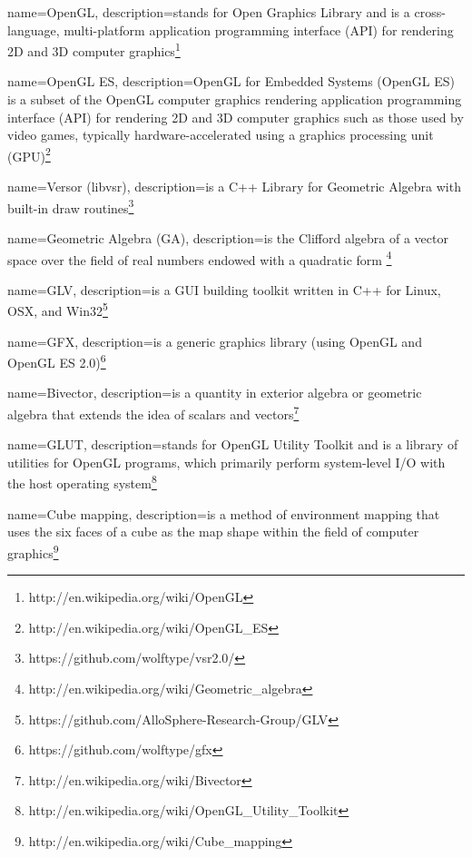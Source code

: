 {
  name=OpenGL,
  description={stands for Open Graphics Library and is a cross-language, multi-platform application programming interface (API) for rendering 2D and 3D computer graphics\footnote{http://en.wikipedia.org/wiki/OpenGL}}
}

{
  name=OpenGL ES,
  description={OpenGL for Embedded Systems (OpenGL ES) is a subset of the OpenGL computer graphics rendering application programming interface (API) for rendering 2D and 3D computer graphics such as those used by video games, typically hardware-accelerated using a graphics processing unit (GPU)\footnote{http://en.wikipedia.org/wiki/OpenGL\_ES}}
}

{
  name=Versor (libvsr),
  description={is a C++ Library for Geometric Algebra with built-in draw routines\footnote{https://github.com/wolftype/vsr2.0/}}
}

{
  name=Geometric Algebra (GA),
  description={is the Clifford algebra of a vector space over the field of real numbers endowed with a quadratic form \footnote{http://en.wikipedia.org/wiki/Geometric\_algebra}}
}

{
  name=GLV,
  description={is a GUI building toolkit written in C++ for Linux, OSX, and Win32\footnote{https://github.com/AlloSphere-Research-Group/GLV}}
}

{
  name=GFX,
  description={is a generic graphics library (using OpenGL and OpenGL ES 2.0)\footnote{https://github.com/wolftype/gfx}}
}

{
  name=Bivector,
  description={is a quantity in exterior algebra or geometric algebra that extends the idea of scalars and vectors\footnote{http://en.wikipedia.org/wiki/Bivector}}
}

{
  name=GLUT,
  description={stands for OpenGL Utility Toolkit and is a library of utilities for OpenGL programs, which primarily perform system-level I/O with the host operating system\footnote{http://en.wikipedia.org/wiki/OpenGL\_Utility\_Toolkit}}
}

{
  name=Cube mapping,
  description={is a method of environment mapping that uses the six faces of a cube as the map shape within the field of computer graphics\footnote{http://en.wikipedia.org/wiki/Cube\_mapping}}
}